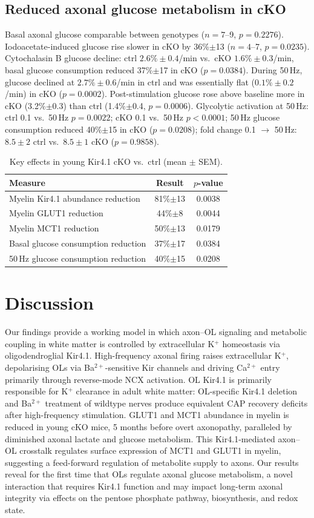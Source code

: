 \documentclass[11pt]{article}
\begin{document}
\subsection{Reduced axonal glucose metabolism in cKO}
Basal axonal glucose comparable between genotypes ($n=7$--9, $p=0.2276$). Iodoacetate-induced glucose rise slower in cKO by 36\%$\pm$13 ($n=4$--7, $p=0.0235$). Cytochalasin B glucose decline: ctrl $2.6\%\pm0.4$/min vs.\ cKO $1.6\%\pm0.3$/min, basal glucose consumption reduced 37\%$\pm$17 in cKO ($p=0.0384$). During 50\,Hz, glucose declined at $2.7\%\pm0.6$/min in ctrl and was essentially flat ($0.1\%\pm0.2$/min) in cKO ($p=0.0002$). Post-stimulation glucose rose above baseline more in cKO (3.2\%$\pm$0.3) than ctrl (1.4\%$\pm$0.4, $p=0.0006$). Glycolytic activation at 50\,Hz: ctrl 0.1 vs.\ 50\,Hz $p=0.0022$; cKO 0.1 vs.\ 50\,Hz $p<0.0001$; 50\,Hz glucose consumption reduced 40\%$\pm$15 in cKO ($p=0.0208$); fold change 0.1 $\to$ 50\,Hz: $8.5\pm 2$ ctrl vs.\ $8.5\pm 1$ cKO ($p=0.9858$).

\begin{table}[h]
\centering
\caption{Key effects in young Kir4.1 cKO vs.\ ctrl (mean $\pm$ SEM).}
\begin{tabular}{lcc}
\toprule
Measure & Result & $p$-value \\
\midrule
Myelin Kir4.1 abundance reduction & 81\%$\pm$13 & 0.0038 \\
Myelin GLUT1 reduction & 44\%$\pm$8 & 0.0044 \\
Myelin MCT1 reduction & 50\%$\pm$13 & 0.0179 \\
Basal glucose consumption reduction & 37\%$\pm$17 & 0.0384 \\
50\,Hz glucose consumption reduction & 40\%$\pm$15 & 0.0208 \\
\bottomrule
\end{tabular}
\end{table}

\section{Discussion}
Our findings provide a working model in which axon--OL signaling and metabolic coupling in white matter is controlled by extracellular K$^+$ homeostasis via oligodendroglial Kir4.1. High-frequency axonal firing raises extracellular K$^+$, depolarising OLs via Ba$^{2+}$-sensitive Kir channels and driving Ca$^{2+}$ entry primarily through reverse-mode NCX activation. OL Kir4.1 is primarily responsible for K$^+$ clearance in adult white matter: OL-specific Kir4.1 deletion and Ba$^{2+}$ treatment of wildtype nerves produce equivalent CAP recovery deficits after high-frequency stimulation. GLUT1 and MCT1 abundance in myelin is reduced in young cKO mice, 5 months before overt axonopathy, paralleled by diminished axonal lactate and glucose metabolism. This Kir4.1-mediated axon--OL crosstalk regulates surface expression of MCT1 and GLUT1 in myelin, suggesting a feed-forward regulation of metabolite supply to axons. Our results reveal for the first time that OLs regulate axonal glucose metabolism, a novel interaction that requires Kir4.1 function and may impact long-term axonal integrity via effects on the pentose phosphate pathway, biosynthesis, and redox state.



\end{document}
